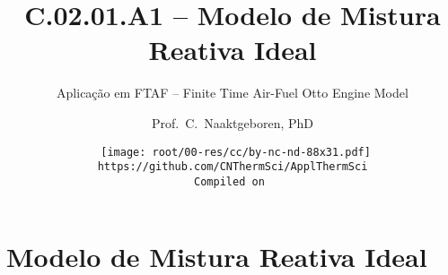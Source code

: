 \makeatletter
\immediate{} %
\makeatother



\title{C.02.01.A1 -- Modelo de Mistura Reativa Ideal}
\subtitle{Aplicação em FTAF -- Finite Time Air-Fuel Otto Engine Model}
\author{Prof.~C.~Naaktgeboren, PhD}
\date{{\scriptsize\tt%
    \texttt{[image: root/00-res/cc/by-nc-nd-88x31.pdf]}\\[\smallskipamount]
    https://github.com/CNThermSci/ApplThermSci\\
    Compiled on 
}}

\logo{%
    \parbox{158mm}{%
        \texttt{[image: root/00-res/UTFPR/UTFPR-logo-D.pdf]}\hfill%
        \texttt{[image: root/00-res/logo/CNThermSci-logo-A.pdf]}%
}} %
\frame{\titlepage}

\section{Modelo de Mistura Reativa Ideal}

